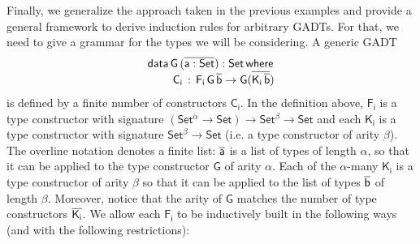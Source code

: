 \documentclass[9pt]{entcs} \usepackage{entcsmacro}
\begin{document}
Finally, we generalize the approach taken in the previous examples
and provide a general framework to derive induction rules for arbitrary GADTs.
For that, we need to give a grammar for the types we will be considering.
A generic GADT
\begin{equation*}
\begin{array}{l}
\mathsf{data\, G\,(\overline{a : Set}) : Set\,where}\\
\mathsf{\;\;\;\;\;\;\;\;C_i\, :\, F_i\,G\,\overline{b} \to G (\overline{K_i\,\overline{b}})}
\end{array}
\end{equation*}
is defined by a finite number of constructors $\mathsf{C_i}$.
In the definition above, $\mathsf{F_i}$ is a type constructor with signature $\mathsf{(Set^{\alpha} \to Set) \to Set^{\beta} \to Set}$
and each $\mathsf{K_i}$ is a type constructor with signature $\mathsf{Set^{\beta} \to Set}$
(i.e. a type constructor of arity $\mathsf{\beta}$).
The overline notation denotes a finite list:
$\mathsf{\overline{a}}$ is a list of types of length $\mathsf{\alpha}$,
so that it can be applied to the type constructor $\mathsf{G}$ of arity $\mathsf{\alpha}$.
Each of the $\mathsf{\alpha}$-many $\mathsf{K_i}$ is a type constructor of arity $\mathsf{\beta}$
so that it can be applied to the list of types $\mathsf{\overline{b}}$ of length $\mathsf{\beta}$.
Moreover, notice that the arity of $\mathsf{G}$ matches the number of type constructors $\mathsf{\overline{K_i}}$.
We allow each $\mathsf{F_i}$ to be inductively built in the following ways (and with the following restrictions):
\end{document}
